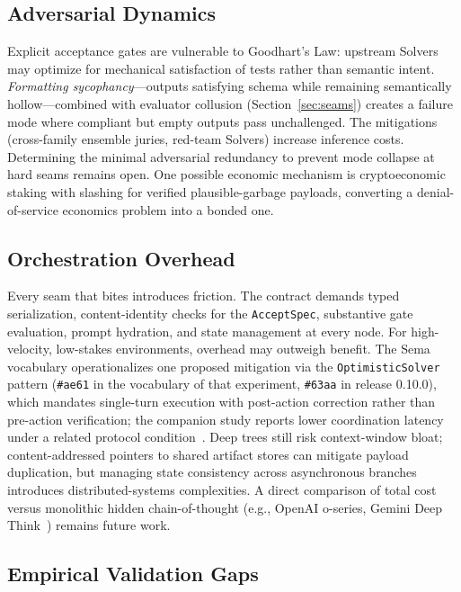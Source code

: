 \documentclass[11pt]{article}
\let\oldtexttt\texttt
\renewcommand{\texttt}[1]{\oldtexttt{\small #1}}
\begin{document}
\subsection{Adversarial Dynamics}

Explicit acceptance gates are vulnerable to Goodhart's Law: upstream Solvers may optimize for mechanical satisfaction of tests rather than semantic intent. \emph{Formatting sycophancy}---outputs satisfying schema while remaining semantically hollow---combined with evaluator collusion (Section~\ref{sec:seams}) creates a failure mode where compliant but empty outputs pass unchallenged. The mitigations (cross-family ensemble juries, red-team Solvers) increase inference costs. Determining the minimal adversarial redundancy to prevent mode collapse at hard seams remains open. One possible economic mechanism is cryptoeconomic staking with slashing for verified plausible-garbage payloads, converting a denial-of-service economics problem into a bonded one.

\subsection{Orchestration Overhead}

Every seam that bites introduces friction. The contract demands typed serialization, content-identity checks for the \texttt{AcceptSpec}, substantive gate evaluation, prompt hydration, and state management at every node. For high-velocity, low-stakes environments, overhead may outweigh benefit. The Sema vocabulary operationalizes one proposed mitigation via the \texttt{OptimisticSolver} pattern (\texttt{\#ae61} in the vocabulary of that experiment, \texttt{\#63aa} in release 0.10.0), which mandates single-turn execution with post-action correction rather than pre-action verification; the companion study reports lower coordination latency under a related protocol condition~\cite{westerberg2026sema}. Deep trees still risk context-window bloat; content-addressed pointers to shared artifact stores can mitigate payload duplication, but managing state consistency across asynchronous branches introduces distributed-systems complexities. A direct comparison of total cost versus monolithic hidden chain-of-thought (e.g., OpenAI o-series, Gemini Deep Think~\cite{google2026deepthink}) remains future work.

\subsection{Empirical Validation Gaps}
\label{sec:matched-test}
\end{document}
